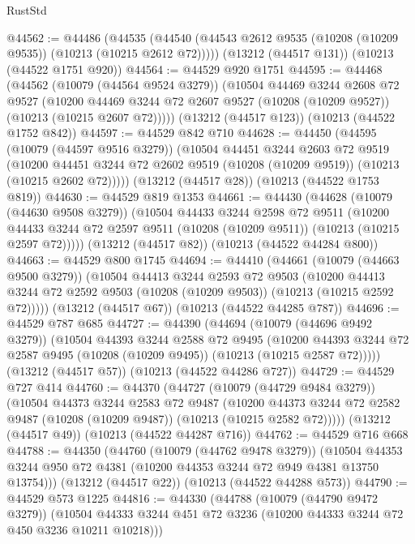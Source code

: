 \begin{lexlean}{RustStd}
\begin{coremodule}
@44562 := @44486
    (@44535 (@44540 (@44543 @2612 @9535 (@10208 (@10209 @9535)) (@10213 (@10215 @2612 @72)))))
    (@13212 (@44517 @131))
    (@10213 (@44522 @1751 @920))
@44564 := @44529 @920 @1751
@44595 := @44468
    (@44562
      (@10079 (@44564 @9524 @3279))
      (@10504
        @44469
        @3244
        @2608
        @72
        @9527
        (@10200 @44469 @3244 @72 @2607 @9527 (@10208 (@10209 @9527)) (@10213 (@10215 @2607 @72)))))
    (@13212 (@44517 @123))
    (@10213 (@44522 @1752 @842))
@44597 := @44529 @842 @710
@44628 := @44450
    (@44595
      (@10079 (@44597 @9516 @3279))
      (@10504
        @44451
        @3244
        @2603
        @72
        @9519
        (@10200 @44451 @3244 @72 @2602 @9519 (@10208 (@10209 @9519)) (@10213 (@10215 @2602 @72)))))
    (@13212 (@44517 @28))
    (@10213 (@44522 @1753 @819))
@44630 := @44529 @819 @1353
@44661 := @44430
    (@44628
      (@10079 (@44630 @9508 @3279))
      (@10504
        @44433
        @3244
        @2598
        @72
        @9511
        (@10200 @44433 @3244 @72 @2597 @9511 (@10208 (@10209 @9511)) (@10213 (@10215 @2597 @72)))))
    (@13212 (@44517 @82))
    (@10213 (@44522 @44284 @800))
@44663 := @44529 @800 @1745
@44694 := @44410
    (@44661
      (@10079 (@44663 @9500 @3279))
      (@10504
        @44413
        @3244
        @2593
        @72
        @9503
        (@10200 @44413 @3244 @72 @2592 @9503 (@10208 (@10209 @9503)) (@10213 (@10215 @2592 @72)))))
    (@13212 (@44517 @67))
    (@10213 (@44522 @44285 @787))
@44696 := @44529 @787 @685
@44727 := @44390
    (@44694
      (@10079 (@44696 @9492 @3279))
      (@10504
        @44393
        @3244
        @2588
        @72
        @9495
        (@10200 @44393 @3244 @72 @2587 @9495 (@10208 (@10209 @9495)) (@10213 (@10215 @2587 @72)))))
    (@13212 (@44517 @57))
    (@10213 (@44522 @44286 @727))
@44729 := @44529 @727 @414
@44760 := @44370
    (@44727
      (@10079 (@44729 @9484 @3279))
      (@10504
        @44373
        @3244
        @2583
        @72
        @9487
        (@10200 @44373 @3244 @72 @2582 @9487 (@10208 (@10209 @9487)) (@10213 (@10215 @2582 @72)))))
    (@13212 (@44517 @49))
    (@10213 (@44522 @44287 @716))
@44762 := @44529 @716 @668
@44788 := @44350
    (@44760
      (@10079 (@44762 @9478 @3279))
      (@10504 @44353 @3244 @950 @72 @4381 (@10200 @44353 @3244 @72 @949 @4381 @13750 @13754)))
    (@13212 (@44517 @22))
    (@10213 (@44522 @44288 @573))
@44790 := @44529 @573 @1225
@44816 := @44330
    (@44788
      (@10079 (@44790 @9472 @3279))
      (@10504 @44333 @3244 @451 @72 @3236 (@10200 @44333 @3244 @72 @450 @3236 @10211 @10218)))

\end{coremodule}
\end{lexlean}
